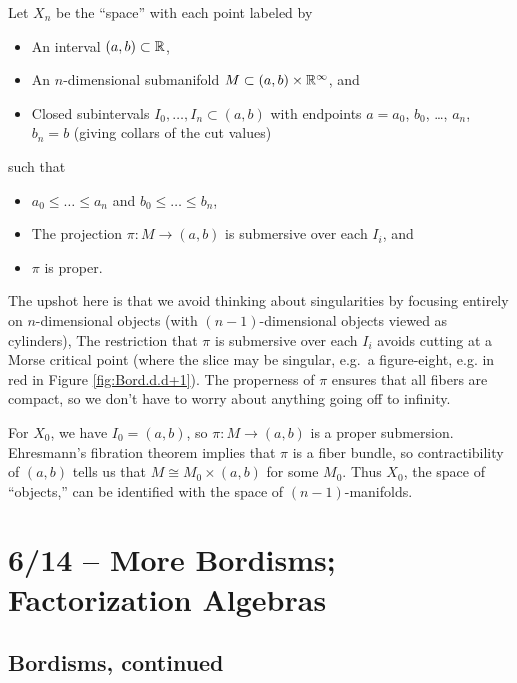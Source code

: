 \begin{dfn}
	Let $X_n$ be the ``space'' with each point labeled by
	\begin{itemize}
		\item An interval $(a, b) \subset \mathbb{R}$,
		\item An $n$-dimensional submanifold $M \subset (a, b) \times \mathbb{R}^{\infty}$, and
		\item Closed subintervals $I_0, \dots, I_n \subset (a, b)$ with endpoints $a = a_0$, $b_0$, \dots, $a_n$, $b_n = b$ (giving collars of the cut values)
	\end{itemize}
	such that
	\begin{itemize}
		\item $a_0 \leq \dots \leq a_n$ and $b_0 \leq \dots \leq b_n$,
		\item The projection $\pi: M \to (a, b)$ is submersive over each $I_i$, and
		\item $\pi$ is proper.
	\end{itemize}
\end{dfn}

The upshot here is that we avoid thinking about singularities by focusing entirely on $n$-dimensional objects (with $(n-1)$-dimensional objects viewed as cylinders),
The restriction that $\pi$ is submersive over each $I_i$ avoids cutting at a Morse critical point (where the slice may be singular, e.g.\ a figure-eight, e.g. in red in Figure \ref{fig:Bord.d.d+1}).
The properness of $\pi$ ensures that all fibers are compact, so we don't have to worry about anything going off to infinity.

\begin{ex}
	For $X_0$, we have $I_0 = (a, b)$, so $\pi: M \to (a, b)$ is a proper submersion.
	Ehresmann's fibration theorem implies that $\pi$ is a fiber bundle, so contractibility of $(a, b)$ tells us that $M \cong M_0 \times (a, b)$ for some $M_0$.
	Thus $X_0$, the space of ``objects,'' can be identified with the space of $(n-1)$-manifolds.
\end{ex}

\section{6/14 -- More Bordisms; Factorization Algebras}

\subsection{Bordisms, continued}

